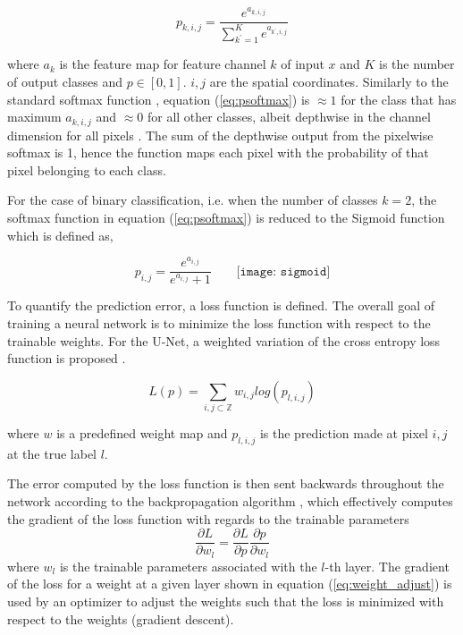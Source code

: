 \documentclass[../main/thesis.tex]{subfiles}
\begin{document}
\begin{equation}
    \label{eq:psoftmax}
    p_{k,i,j} = \frac{e^{a_{k,i,j}}}{\sum_{k^{\prime} = 1}^Ke^{a_{k^\prime,i,j}}}
\end{equation}

where $a_k$ is the feature map for feature channel $k$ of input $x$ and $K$ is the number of output classes and $p \in \left[0, 1\right]$. $i,j$ are the spatial coordinates. Similarly to the standard softmax function \citep{Bridle1990}, equation (\ref{eq:psoftmax}) is $\approx 1$ for the class that has maximum $a_{k,i,j}$ and $\approx 0$ for all other classes, albeit depthwise in the channel dimension for all pixels \citep{Ronneberger2015}. The sum of the depthwise output from the pixelwise softmax is 1, hence the function maps each pixel with the probability of that pixel belonging to each class. 

For the case of binary classification, i.e. when the number of classes $k=2$, the softmax function in equation (\ref{eq:psoftmax}) is reduced to the Sigmoid function which is defined as, 

\begin{equation}
    \label{eq:sigmoid}
    p_{i,j} = \frac{e^{a_{i,j}}}{e^{a_{i,j}} + 1} \qquad
    \texttt{[image: sigmoid]}
\end{equation}

To quantify the prediction error, a loss function is defined. The overall goal of training a neural network is to minimize the loss function with respect to the trainable weights. For the U-Net, a weighted variation of the cross entropy loss function is proposed \citep{Ronneberger2015}. 

\begin{equation}
    \label{eq:unet-loss}
    L(p) = \sum_{i,j \subset \mathbb{Z}}w_{i,j}log(p_{l,i,j})
\end{equation}

where $w$ is a predefined weight map and $p_{l,i,j}$ is the prediction made at pixel $i,j$ at the true label $l$.

The error computed by the loss function is then sent backwards throughout the network according to the backpropagation algorithm \citep{Rumelhart1986}, which effectively computes the gradient of the loss function with regards to the trainable parameters 
\begin{equation}
    \label{eq:weight_adjust}
    \frac{\partial L}{\partial w_l} = \frac{\partial L}{\partial p}\frac{\partial p}{\partial w_l}
\end{equation}
where $w_l$ is the trainable parameters associated with the $l$-th layer. The gradient of the loss for a weight at a given layer shown in equation (\ref{eq:weight_adjust}) is used by an optimizer to adjust the weights such that the loss is minimized with respect to the weights (gradient descent).
\end{document}
